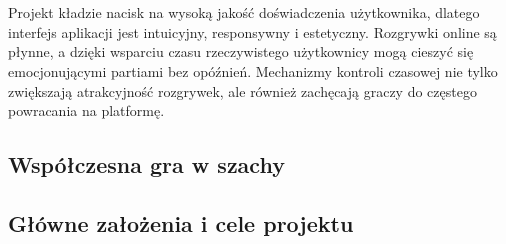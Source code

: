 \documentclass[12pt,a4paper]{article}
\begin{document}
\\\\
Projekt kładzie nacisk na wysoką jakość doświadczenia użytkownika, dlatego interfejs aplikacji jest intuicyjny, responsywny i estetyczny. Rozgrywki online są płynne, a dzięki wsparciu czasu rzeczywistego użytkownicy mogą cieszyć się emocjonującymi partiami bez opóźnień. Mechanizmy kontroli czasowej nie tylko zwiększają atrakcyjność rozgrywek, ale również zachęcają graczy do częstego powracania na platformę.

\newpage

\subsection{Współczesna gra w szachy}

\newpage

\subsection{Główne założenia i cele projektu}
\end{document}
